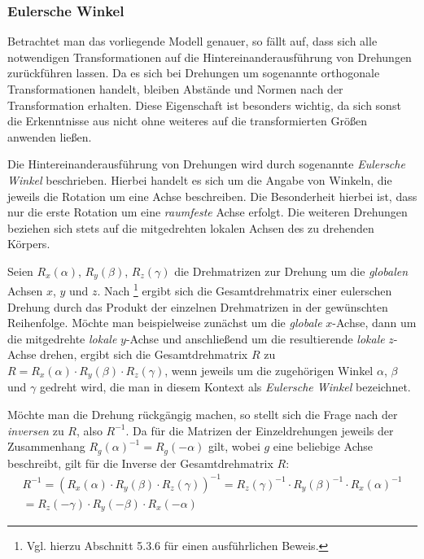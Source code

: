 \subsubsection{Eulersche Winkel}

Betrachtet man das vorliegende Modell genauer, so f\"allt auf, dass sich alle notwendigen Transformationen auf die
Hintereinanderausf\"uhrung von Drehungen zur\"uckf\"uhren lassen. Da es sich bei Drehungen um sogenannte orthogonale Transformationen
handelt, bleiben Abst\"ande und Normen nach der Transformation erhalten. Diese Eigenschaft ist besonders wichtig, da sich sonst
die Erkenntnisse aus  nicht ohne weiteres auf die transformierten Gr\"o{\ss}en anwenden lie{\ss}en.

Die Hintereinanderausf\"uhrung von Drehungen wird durch sogenannte \textit{Eulersche Winkel} beschrieben. Hierbei handelt es sich
um die Angabe von Winkeln, die jeweils die Rotation um eine Achse beschreiben. Die Besonderheit hierbei ist, dass nur die erste
Rotation um eine \textit{raumfeste} Achse erfolgt. Die weiteren Drehungen beziehen sich stets auf die mitgedrehten lokalen Achsen des
zu drehenden K\"orpers.

Seien \(R_x(\alpha)\), \(R_y(\beta)\), \(R_z(\gamma)\) die Drehmatrizen zur Drehung um die \textit{globalen} Achsen \(x\), \(y\)
und \(z\). Nach \cite{Fis12}\footnote{Vgl. hierzu Abschnitt 5.3.6 f\"ur einen ausf\"uhrlichen Beweis.} ergibt sich die
Gesamtdrehmatrix einer eulerschen Drehung durch das Produkt der einzelnen Drehmatrizen
in der gew\"unschten Reihenfolge. M\"ochte man beispielweise zun\"achst um die \textit{globale} \(x\)-Achse, dann um die mitgedrehte
\textit{lokale} \(y\)-Achse und anschlie{\ss}end um die resultierende \textit{lokale} \(z\)-Achse drehen, ergibt sich die
Gesamtdrehmatrix \(R\) zu \(R = R_x(\alpha) \cdot R_y(\beta) \cdot R_z(\gamma)\), wenn jeweils um die zugeh\"origen Winkel
\(\alpha\), \(\beta\) und \(\gamma\) gedreht wird, die man in diesem Kontext als \textit{Eulersche Winkel} bezeichnet.

M\"ochte man die Drehung r\"uckg\"angig machen, so stellt sich die Frage nach der \textit{inversen} zu \(R\), also \(R^{-1}\).
Da f\"ur die Matrizen der Einzeldrehungen jeweils der Zusammenhang \(R_g(\alpha)^{-1} = R_g(-\alpha)\) gilt, wobei \(g\) eine beliebige
Achse beschreibt, gilt f\"ur die Inverse der Gesamtdrehmatrix \(R\):
\begin{equation}
  \label{eq:gesamtdrehung}
  \begin{split}
R^{-1} = \left(R_x(\alpha) \cdot R_y(\beta) \cdot R_z(\gamma)\right)^{-1} = R_z(\gamma)^{-1} \cdot R_y(\beta)^{-1} \cdot
R_x(\alpha)^{-1} \\
= R_z(-\gamma) \cdot R_y(-\beta) \cdot R_x(-\alpha)
  \end{split}
\end{equation}

